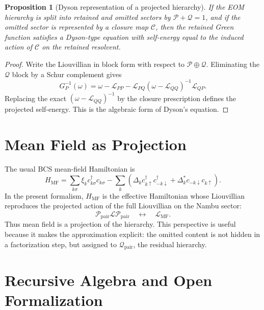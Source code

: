\documentclass[aps,prb,reprint,superscriptaddress,nofootinbib]{revtex4-2}
\newtheorem{proposition}{Proposition}
\newcommand{\Liouv}{\mathcal{L}}
\newcommand{\Pc}{\mathcal{P}}
\newcommand{\Qc}{\mathcal{Q}}
\newcommand{\Cc}{\mathcal{C}}
\begin{document}
\begin{proposition}[Dyson representation of a projected hierarchy]
If the EOM hierarchy is split into retained and omitted sectors by \(\Pc+\Qc=1\), and if the omitted sector is represented by a closure map \(\Cc\), then the retained Green function satisfies a Dyson-type equation with self-energy equal to the induced action of \(\Cc\) on the retained resolvent.
\end{proposition}

\begin{proof}
Write the Liouvillian in block form with respect to \(\Pc\oplus\Qc\). Eliminating the \(\Qc\) block by a Schur complement gives
\begin{equation}
G_P^{-1}(\omega)
=\omega-\Liouv_{PP}
-\Liouv_{PQ}(\omega-\Liouv_{QQ})^{-1}\Liouv_{QP}.
\end{equation}
Replacing the exact \((\omega-\Liouv_{QQ})^{-1}\) by the closure prescription defines the projected self-energy. This is the algebraic form of Dyson's equation.
\end{proof}

\section{Mean Field as Projection}

The usual BCS mean-field Hamiltonian is
\begin{equation}
H_{\mathrm{MF}}=
\sum_{k\sigma}\xi_k c^\dagger_{k\sigma}c_{k\sigma}
-\sum_k \left(
\Delta_k c^\dagger_{k\uparrow}c^\dagger_{-k\downarrow}
+\Delta_k^\ast c_{-k\downarrow}c_{k\uparrow}
\right).
\end{equation}
In the present formalism, \(H_{\mathrm{MF}}\) is the effective Hamiltonian whose Liouvillian reproduces the projected action of the full Liouvillian on the Nambu sector:
\begin{equation}
\Pc_{\mathrm{pair}}\Liouv \Pc_{\mathrm{pair}}
\quad\longleftrightarrow\quad
\Liouv_{\mathrm{MF}}.
\end{equation}
Thus mean field is a projection of the hierarchy. This perspective is useful because it makes the approximation explicit: the omitted content is not hidden in a factorization step, but assigned to \(\Qc_{\mathrm{pair}}\), the residual hierarchy.

\section{Recursive Algebra and Open Formalization}
\end{document}
